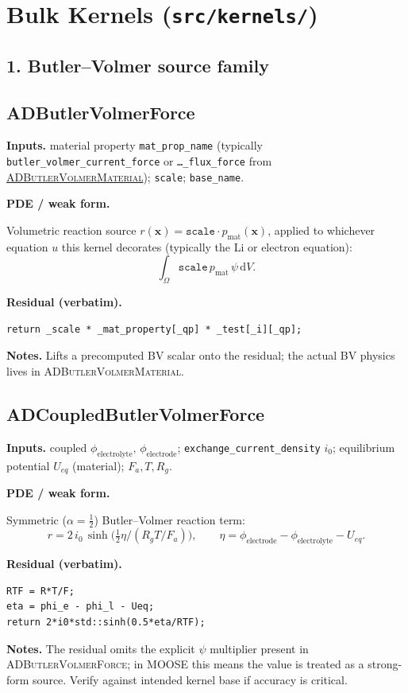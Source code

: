 \documentclass[11pt]{article}
\newcommand{\F}{F_{\!a}}            %
\newcommand{\Rg}{R_{\!g}}           %
\newcommand{\dV}{\,\mathrm{d}V}
\newenvironment{ecmEntry}[1]{%
  \subsection{#1}%
}{}
\newcommand{\inputsRow}[1]{\par\noindent\textbf{Inputs.} #1\par}
\newcommand{\pdeRow}[1]{\par\noindent\textbf{PDE / weak form.}\par #1\par}
\newcommand{\codeRow}{\par\noindent\textbf{Residual (verbatim).}\par}
\newcommand{\notesRow}[1]{\par\noindent\textbf{Notes.} #1\par}
\begin{document}
\section{Bulk Kernels (\texttt{src/kernels/})}

\subsection*{1. Butler--Volmer source family}

\begin{ecmEntry}{ADButlerVolmerForce}
\inputsRow{material property \texttt{mat\_prop\_name} (typically
\texttt{butler\_volmer\_current\_force} or \texttt{\dots\_flux\_force} from
\hyperref[bv-mat]{\textsc{ADButlerVolmerMaterial}}); \texttt{scale}; \texttt{base\_name}.}
\pdeRow{Volumetric reaction source
$r(\mathbf{x}) = \texttt{scale}\cdot p_{\text{mat}}(\mathbf{x})$, applied
to whichever equation $u$ this kernel decorates (typically the Li or electron equation):
\[
  \int_\Omega \texttt{scale}\,p_{\text{mat}}\,\psi \dV.
\]}
\codeRow\begin{lstlisting}
return _scale * _mat_property[_qp] * _test[_i][_qp];
\end{lstlisting}
\notesRow{Lifts a precomputed BV scalar onto the residual; the actual BV physics lives
in \textsc{ADButlerVolmerMaterial}.}
\end{ecmEntry}

\begin{ecmEntry}{ADCoupledButlerVolmerForce}
\inputsRow{coupled $\phi_{\text{electrolyte}},\,\phi_{\text{electrode}}$;
\texttt{exchange\_current\_density} $i_0$; equilibrium potential $U_{eq}$ (material);
$\F,T,\Rg$.}
\pdeRow{Symmetric ($\alpha\!=\!\tfrac{1}{2}$) Butler--Volmer reaction term:
\[
  r = 2\,i_0\,\sinh\!\bigl(\tfrac{1}{2}\eta/(\Rg T/\F)\bigr),
  \qquad \eta = \phi_{\text{electrode}} - \phi_{\text{electrolyte}} - U_{eq}.
\]}
\codeRow\begin{lstlisting}
RTF = R*T/F;
eta = phi_e - phi_l - Ueq;
return 2*i0*std::sinh(0.5*eta/RTF);
\end{lstlisting}
\notesRow{The residual omits the explicit $\psi$ multiplier present in
\textsc{ADButlerVolmerForce}; in MOOSE this means the value is treated as a strong-form
source. Verify against intended kernel base if accuracy is critical.}
\end{ecmEntry}
\end{document}
